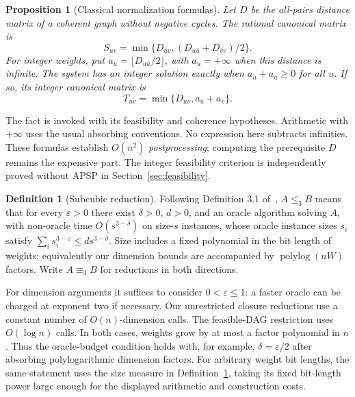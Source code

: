 \documentclass[manuscript,11pt,screen,nonacm]{acmart}
\newtheorem{proposition}[theorem]{Proposition}
\theoremstyle{definition}
\newtheorem{definition}[theorem]{Definition}
\newcommand{\polylog}{\operatorname{polylog}}
\begin{document}
\begin{proposition}[Classical normalization formulas]\label{prop:normal}
Let $D$ be the all-pairs distance matrix of a coherent graph without negative cycles. The rational canonical matrix is
\begin{equation}\label{eq:strong}
 S_{uv}=\min\{D_{uv},(D_{u\bar u}+D_{\bar v v})/2\}.
\end{equation}
For integer weights, put $a_u=\lfloor D_{u\bar u}/2\rfloor$, with $a_u=+\infty$ when this distance is infinite. The system has an integer solution exactly when $a_u+a_{\bar u}\geq0$ for all $u$. If so, its integer canonical matrix is
\begin{equation}\label{eq:tight}
 T_{uv}=\min\{D_{uv},a_u+a_{\bar v}\}.
\end{equation}
\end{proposition}
The fact is invoked with its feasibility and coherence hypotheses. Arithmetic with $+\infty$ uses the usual absorbing conventions. No expression here subtracts infinities. These formulas establish $O(n^2)$ \emph{postprocessing}; computing the prerequisite $D$ remains the expensive part. The integer feasibility criterion is independently proved without APSP in Section~\ref{sec:feasibility}.

\begin{definition}[Subcubic reduction]\label{def:red}
Following Definition 3.1 of~\cite{vvw2018}, $A\leq_3 B$ means that for every $\varepsilon>0$ there exist $\delta>0$, $d>0$, and an oracle algorithm solving $A$, with non-oracle time $O(s^{3-\delta})$ on size-$s$ instances, whose oracle instance sizes $s_i$ satisfy $\sum_i s_i^{3-\varepsilon}\leq d s^{3-\delta}$. Size includes a fixed polynomial in the bit length of weights; equivalently our dimension bounds are accompanied by $\polylog(nW)$ factors. Write $A\equiv_3B$ for reductions in both directions.
\end{definition}
For dimension arguments it suffices to consider $0<\varepsilon\leq1$: a faster oracle can be charged at exponent two if necessary. Our unrestricted closure reductions use a constant number of $O(n)$-dimension calls. The feasible-DAG restriction uses $O(\log n)$ calls. In both cases, weights grow by at most a factor polynomial in $n$. Thus the oracle-budget condition holds with, for example, $\delta=\varepsilon/2$ after absorbing polylogarithmic dimension factors. For arbitrary weight bit lengths, the same statement uses the size measure in Definition~\ref{def:red}, taking its fixed bit-length power large enough for the displayed arithmetic and construction costs.
\end{document}
